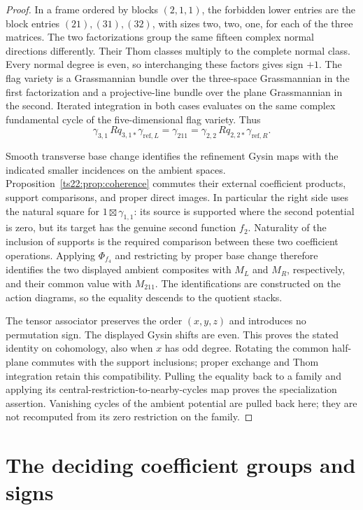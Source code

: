 \begin{proof}
In a frame ordered by blocks $(2,1,1)$, the forbidden lower entries
are the block entries $(21),(31),(32)$, with sizes two, two, one,
for each of the three matrices. The two factorizations group the
same fifteen complex normal directions differently. Their Thom
classes multiply to the complete normal class. Every normal degree
is even, so interchanging these factors gives sign $+1$.
The flag variety is a Grassmannian bundle over the three-space
Grassmannian in the first factorization and a projective-line
bundle over the plane Grassmannian in the second. Iterated
integration in both cases evaluates on the same complex fundamental
cycle of the five-dimensional flag variety. Thus
\[
 \gamma_{3,1}\,Rq_{3,1*}\gamma_{\mathrm{ref},L}
       =\gamma_{211}
       =\gamma_{2,2}\,Rq_{2,2*}\gamma_{\mathrm{ref},R}.
\]

Smooth transverse base change identifies the refinement Gysin maps
with the indicated smaller incidences on the ambient spaces.
Proposition~\ref{ts22:prop:coherence} commutes their external coefficient
products, support comparisons, and proper direct images. In
particular the right side uses the natural square for
$1\boxtimes\gamma_{1,1}$: its source is supported where the second
potential is zero, but its target has the genuine second function
$f_2$. Naturality of the inclusion of supports is the required
comparison between these two coefficient operations.
Applying $\Phi_{f_4}$ and restricting by proper base change therefore
identifies the two displayed ambient composites with $M_L$ and
$M_R$, respectively, and their common value with $M_{211}$.
The identifications are constructed on the action diagrams, so the
equality descends to the quotient stacks.

The tensor associator preserves the order $(x,y,z)$ and introduces
no permutation sign. The displayed Gysin shifts are
even. This proves the stated identity on cohomology, also when $x$
has odd degree. Rotating the common half-plane commutes with the
support inclusions; proper exchange and Thom integration retain
this compatibility. Pulling the equality back to a family and
applying its central-restriction-to-nearby-cycles map proves the
specialization assertion. Vanishing cycles of the ambient potential
are pulled back here; they are not recomputed from its zero
restriction on the family.
\end{proof}

\section{The deciding coefficient groups and signs}
\label{ts22:sec:stalks}

